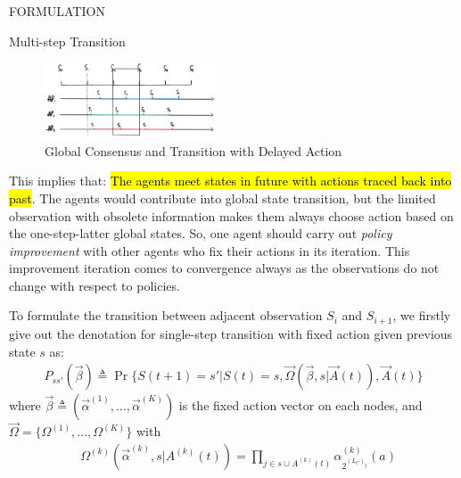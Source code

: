 \documentclass[10pt, conference, letterpaper]{IEEEtran}
\begin{document}
\begin{section}{FORMULATION}
\begin{subsection}{Multi-step Transition}
            \begin{figure}[ht]
                \centering
                \includegraphics[width=0.45\textwidth]{broadcast-trans.png}
                \caption{Global Consensus and Transition with Delayed Action}
                \label{fig:br-trans}
            \end{figure}

            This implies that: \hl{The agents meet states in future with actions traced back into past}. The agents would contribute into global state transition, but the limited observation with obsolete information makes them always choose action based on the one-step-latter global states. So, one agent should carry out \emph{policy improvement} with other agents who fix their actions in its iteration. This improvement iteration comes to convergence always as the observations do not change with respect to policies.

            To formulate the transition between adjacent observation $S_i$ and $S_{i+1}$, we firstly give out the denotation for single-step transition with fixed action given previous state $s$ as:
            \begin{align}
                P_{ss'}(\vec{\beta}) \triangleq \Pr\{ S(t+1)=s'|S(t)=s, \vec{\Omega}(\vec{\beta},s|\vec{A}(t)),\vec{A}(t) \}
            \end{align}
            where $\vec{\beta} \triangleq (\vec{\alpha}^{(1)}, \dots, \vec{\alpha}^{(K)})$ is the fixed action vector on each nodes, and $\vec{\Omega}=\{\Omega^{(1)},\dots,\Omega^{(K)}\}$ with
            \begin{align}
                &\Omega^{(k)}(\vec{\alpha}^{(k)},s|A^{(k)}(t)) 
                = \prod_{j \in s \cup A^{(k)}(t)} \alpha_{2^{(L_C)_j}}^{(k)}(a)
            \end{align}
                

\end{subsection}
\end{section}
\end{document}
